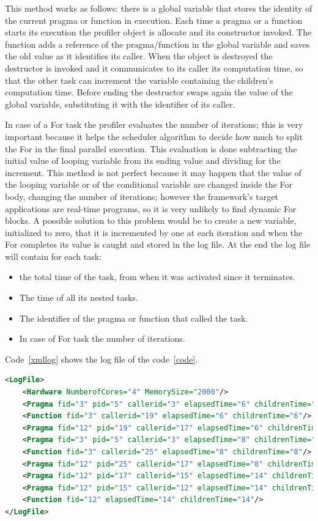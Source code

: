 \documentclass[a4paper,11pt,oneside]{book}
\begin{document}
This method works as follows: there is a global variable that stores the identity of the current pragma or function in execution. Each time a pragma or a function starts its execution the profiler object is allocate and its constructor invoked. The function adds a reference of the pragma/function in the global variable and saves the old value as it identifies its caller. When the object is destroyed the destructor is invoked and it communicates to its caller its computation time, so that the other task can increment the variable containing the children's computation time. Before ending the destructor swaps again the value of the global variable, substituting it with the identifier of its caller. 

In case of a For task the profiler evaluates the number of iterations; this is very important because it helps the scheduler algorithm to decide how much to split the For in the final parallel execution. This evaluation is done subtracting the initial value of looping variable from its ending value and dividing for the increment. This method is not perfect because it may happen that the value of the looping variable or of the conditional variable are changed inside the For body, changing the number of iterations; however the framework’s target applications are real-time programs, so it is very unlikely to find dynamic For blocks. A possible solution to this problem would be to create a new variable, initialized to zero, that it is incremented by one at each iteration and when the For completes its value is caught and stored in the log file. At the end the log file will contain for each task:

\begin{itemize}
\item the total time of the task, from when it was activated since it terminates.
\item The time of all its nested tasks.
\item The identifier of the pragma or function that called the task.
\item In case of For task the number of iterations.
\end{itemize}

Code~\ref{xmllog} shows the log file of the code~\ref{code}.

\begin{lstlisting}[language=XML, caption=XML file of the pragma structure of Code~\ref{code}., label=xmllog]
<LogFile>
	<Hardware NumberofCores="4" MemorySize="2000"/>
	<Pragma fid="3" pid="5" callerid="3" elapsedTime="6" childrenTime="0" loops="6"/>
	<Function fid="3" callerid="19" elapsedTime="6" childrenTime="6"/>
	<Pragma fid="12" pid="19" callerid="17" elapsedTime="6" childrenTime="6"/>
	<Pragma fid="3" pid="5" callerid="3" elapsedTime="8" childrenTime="0" loops="8"/>
	<Function fid="3" callerid="25" elapsedTime="8" childrenTime="8"/>
	<Pragma fid="12" pid="25" callerid="17" elapsedTime="8" childrenTime="8"/>
	<Pragma fid="12" pid="17" callerid="15" elapsedTime="14" childrenTime="14"/>
	<Pragma fid="12" pid="15" callerid="12" elapsedTime="14" childrenTime="14"/>
	<Function fid="12" elapsedTime="14" childrenTime="14"/>
</LogFile>
\end{lstlisting}
\end{document}
